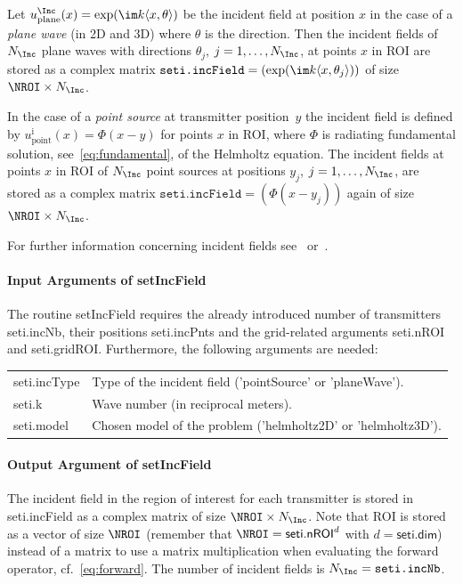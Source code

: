 \documentclass[a4paper]{article}
\begin{document}
Let $u_\mathrm{plane}^\Inc(x) = \exp(\im k \langle x, \theta \rangle)$ be the incident field at position $x$ in the case of a \emph{plane wave} (in 2D and 3D) where $\theta$ is the direction. Then the incident fields of $N_\Inc$ plane waves with directions $\theta_j$, $j = 1,\ldots,N_\Inc$, at points $x$ in ROI are stored as a complex matrix $\texttt{seti.incField} = (\exp(\im k \langle x, \theta_j \rangle))$ of size $\NROI \times N_\Inc$.

In the case of a \emph{point source} at transmitter position~$y$ the incident field is defined by $u_\mathrm{point}^\mathrm{i}(x) = \Phi(x-y)$ for points $x$ in ROI, where $\Phi$ is radiating fundamental solution, see~\eqref{eq:fundamental}, of the Helmholtz equation. The incident fields at points $x$ in ROI of $N_\Inc$ point sources at positions $y_j$, $j = 1, \ldots, N_\Inc$, are stored as a complex matrix $\texttt{seti.incField} = (\Phi(x-y_j))$ again of size $\NROI \times N_\Inc$.

For further information concerning incident fields see~\cite[Ch. 3.5 and 8.4]{Colton2013} or~\cite[Sec.~3.5]{Buergel2017}.

\paragraph{Input Arguments of \textsf{setIncField}} The routine \textsf{setIncField} requires the already introduced number of transmitters \textsf{seti.incNb}, their positions \textsf{seti.incPnts} and the grid-related arguments \textsf{seti.nROI} and \textsf{seti.gridROI}. Furthermore, the following arguments are needed:

\noindent\begin{tabular}[t]{p{2cm} p{13.6cm}}
\textsf{seti.incType} & Type of the incident field (\textsf{'pointSource'} or \textsf{'planeWave'}).\\
\textsf{seti.k}       & Wave number (in reciprocal meters).\\
\textsf{seti.model}   & Chosen model of the problem (\textsf{'helmholtz2D'} or \textsf{'helmholtz3D'}).
\end{tabular}

\paragraph{Output Argument of \textsf{setIncField}} The incident field in the region of interest for each transmitter is stored in \textsf{seti.incField} as a complex matrix of size $\NROI \times N_\Inc$. Note that ROI is stored as a vector of size $\NROI$ (remember that $\NROI = \textsf{seti.nROI}^d$ with $d = \textsf{seti.dim}$) instead of a matrix to use a matrix multiplication when evaluating the forward operator, cf.~\eqref{eq:forward}. The number of incident fields is $N_\Inc = \texttt{seti.incNb}$.
\end{document}
